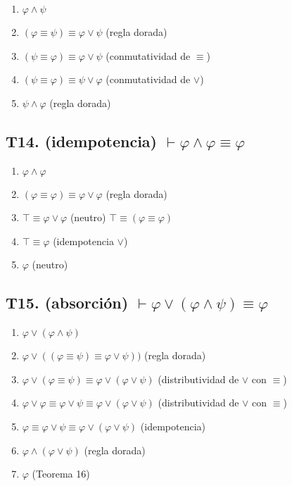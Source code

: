 \begin{enumerate}
    \item $\varphi \land \psi$
    \item $(\varphi \equiv \psi) \equiv \varphi \lor \psi$ \hfill (regla dorada)
    \item $(\psi \equiv \varphi) \equiv \varphi \lor \psi$ \hfill (conmutatividad de $\equiv$)
    \item $(\psi \equiv \varphi) \equiv \psi \lor \varphi$ \hfill (conmutatividad de $\lor$)
    \item $\psi \land \varphi$ \hfill (regla dorada)
\end{enumerate}

\subsection{T14. (idempotencia) $\vdash \varphi \land \varphi \equiv \varphi$}

\begin{enumerate}
    \item $\varphi \land \varphi$
    \item $(\varphi \equiv \varphi) \equiv \varphi \lor \varphi$ \hfill (regla dorada)
    \item $\top \equiv \varphi \lor \varphi$ \hfill (neutro) $\top \equiv (\varphi \equiv \varphi)$
    \item $\top \equiv \varphi$ \hfill (idempotencia $\lor$)
    \item $\varphi$ \hfill (neutro)
\end{enumerate}

\subsection{T15. (absorción) $\vdash \varphi \lor (\varphi \land \psi) \equiv \varphi $}

\begin{enumerate}
    \item $\varphi \lor (\varphi \land \psi)$
    \item $\varphi \lor ((\varphi \equiv \psi) \equiv \varphi \lor \psi))$ \hfill (regla dorada)
    \item $\varphi \lor (\varphi \equiv \psi) \equiv \varphi \lor (\varphi \lor \psi)$ \hfill (distributividad de $\lor$ con $\equiv$)
    \item $\varphi \lor \varphi \equiv \varphi \lor \psi \equiv \varphi \lor (\varphi \lor \psi)$ \hfill (distributividad de $\lor$ con $\equiv$)
    \item $\varphi \equiv \varphi \lor \psi \equiv \varphi \lor (\varphi \lor \psi)$ \hfill (idempotencia)
    \item $\varphi \land (\varphi \lor \psi)$ \hfill (regla dorada)
    \item $\varphi$ \hfill (Teorema 16)
\end{enumerate}

